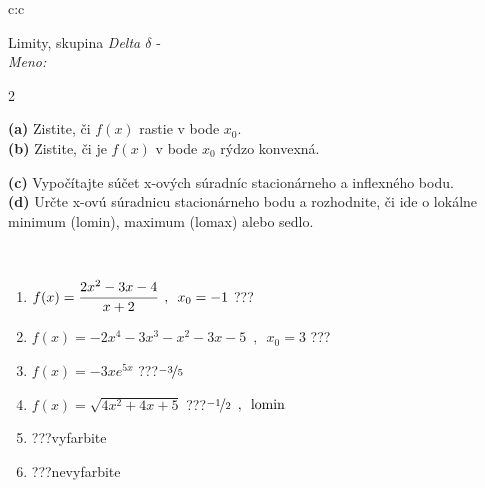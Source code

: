 \documentclass[10pt]{report}
\begin{document}
\begin{tabular}{c:c}
\begin{minipage}[c][104.5mm][t]{0.5\linewidth}
\begin{center}
\vspace{7mm}
{\huge Limity, skupina \textit{Delta $\delta$} -}\\[5mm]
\textit{Meno:}\phantom{xxxxxxxxxxxxxxxxxxxxxxxxxxxxxxxxxxxxxxxxxxxxxxxxxxxxxxxxxxxxxxxxx}\\[5mm]
\begin{minipage}{0.95\linewidth}
\begin{center}
{\small \begin{multicols}{2} \raggedright
\textbf{(a)} Zistite, či \(f(x)\) rastie v bode \(x_0\). \\[1mm]
\textbf{(b)} Zistite, či je \(f(x)\) v bode \(x_0\) rýdzo konvexná. \par \columnbreak
\textbf{(c)} Vypočítajte súčet x-ových súradníc stacionárneho a inflexného bodu. \\[1mm]
\textbf{(d)} Určte x-ovú súradnicu stacionárneho bodu a rozhodnite, či ide o lokálne minimum (lomin), maximum (lomax) alebo sedlo. \\[1mm]
\end{multicols}
}
\end{center}
\end{minipage}
\\[4mm]
\begin{minipage}{0.79\linewidth}
\begin{center}
\begin{varwidth}{\linewidth}
\begin{enumerate}
\normalsize
\item $f(x)=\cfrac{2x^2-3x-4}{x+2}\enspace , \enspace x_0=-1$\quad \dotfill\; ???\;\dotfill \quad {}
\item $f(x)=-2x^4-3x^3-x^2-3x-5\enspace , \enspace x_0=3$\quad \dotfill\; ???\;\dotfill \quad {}
\item $f(x)=-3xe^{5x}$\quad \dotfill\; ???\;\dotfill \quad $\nicefrac{-3}{5}$
\item $f(x)=\sqrt{4x^2+4x+5}$\quad \dotfill\; ???\;\dotfill \quad $\nicefrac{-1}{2}\enspace , \enspace\text{lomin}$
\item \quad \dotfill\; ???\;\dotfill \quad vyfarbite
\item \quad \dotfill\; ???\;\dotfill \quad nevyfarbite
\end{enumerate}
\end{varwidth}

\end{center}
\end{minipage}
\end{center}
\end{minipage}
\end{tabular}
\end{document}

